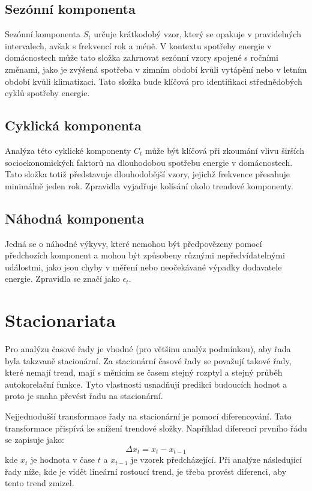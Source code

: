 \documentclass[FM,BP,fonts]{tulthesis}
\begin{document}
\subsection{Sezónní komponenta}
Sezónní komponenta $S_t$ určuje krátkodobý vzor, který se opakuje v pravidelných intervalech, avšak s frekvencí rok a méně. \cite{efjcu-cz} V kontextu spotřeby energie v domácnostech může tato složka zahrnovat sezónní vzory spojené s ročními změnami, jako je zvýšená spotřeba v zimním období kvůli vytápění nebo v letním období kvůli klimatizaci. Tato složka bude klíčová pro identifikaci střednědobých cyklů spotřeby energie.

\subsection{Cyklická komponenta}
Analýza této cyklické komponenty $C_t$ může být klíčová při zkoumání vlivu širších socioekonomických faktorů na dlouhodobou spotřebu energie v domácnostech. Tato složka totiž představuje dlouhodobější vzory, jejichž frekvence přesahuje minimálně jeden rok. \cite{Brockwell2016-qt} Zpravidla vyjadřuje kolísání okolo trendové komponenty.


\subsection{Náhodná komponenta}
 Jedná se o náhodné výkyvy, které nemohou být předpovězeny pomocí předchozích komponent a mohou být způsobeny různými nepředvídatelnými událostmi, jako jsou chyby v měření nebo neočekávané výpadky dodavatele energie. Zpravidla se značí jako  $\epsilon_t$.
 

\section {Stacionariata}
Pro analýzu časové řady je vhodné (pro většinu analýz podmínkou), aby řada byla takzvaně stacionární. Za stacionární časové řady se považují takové řady, které nemají trend, mají s měnícím se časem stejný rozptyl a stejný průběh autokorelační funkce. \cite{efjcu-cz} Tyto vlastnosti usnadňují predikci budoucích hodnot a proto je snaha převést řadu na stacionární. 

Nejjednodušší transformace řady na stacionární je pomocí diferencování. Tato transformace přispívá ke snížení trendové složky. Například diferenci prvního řádu se zapisuje jako:  
\begin{equation}
 \Delta x_t = x_t - x_{t-1}
\end{equation}
kde $x_t$ je hodnota v čase $t$ a $x_{t-1}$ je vzorek předcházející. Při analýze následující řady níže, kde je vidět lineární rostoucí trend, je třeba provést diferenci, aby tento trend zmizel.
 
\end{document}
